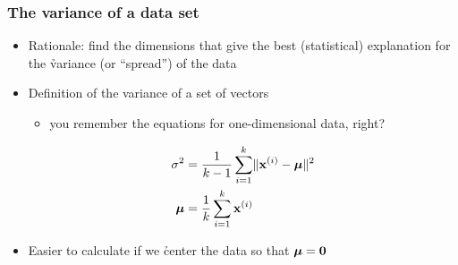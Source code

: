 \begin{frame}
  \frametitle{The variance of a data set}

  \begin{itemize}
  \item Rationale: find the dimensions that give the best (statistical)
    explanation for the \h{variance} (or ``spread'') of the data
  \item Definition of the variance of a set of vectors
    \begin{itemize}
    \item[\hand] you remember the equations for one-dimensional data, right?
    \end{itemize}
    \ungap\pause
    \begin{align*}
      \sigma^2 &= \frac{1}{k-1} \sum_{i=1}^k \norm{\vx[i] - \vmu}^2 \\
      \vmu &= \frac{1}{k} \sum_{i=1}^k \vx[i]
    \end{align*}
  \item Easier to calculate if we \h{center} the data so that $\vmu = \vnull$
  \end{itemize}
\end{frame}

